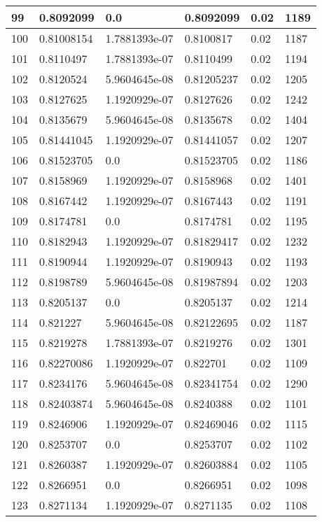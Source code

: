 \begin{longtable}{|l|l|l|l|l|l|}
99 & 0.8092099 & 0.0 & 0.8092099 & 0.02 & 1189 \\ \hline 
100 & 0.81008154 & 1.7881393e-07 & 0.8100817 & 0.02 & 1187 \\ \hline 
101 & 0.8110497 & 1.7881393e-07 & 0.8110499 & 0.02 & 1194 \\ \hline 
102 & 0.8120524 & 5.9604645e-08 & 0.81205237 & 0.02 & 1205 \\ \hline 
103 & 0.8127625 & 1.1920929e-07 & 0.8127626 & 0.02 & 1242 \\ \hline 
104 & 0.8135679 & 5.9604645e-08 & 0.8135678 & 0.02 & 1404 \\ \hline 
105 & 0.81441045 & 1.1920929e-07 & 0.81441057 & 0.02 & 1207 \\ \hline 
106 & 0.81523705 & 0.0 & 0.81523705 & 0.02 & 1186 \\ \hline 
107 & 0.8158969 & 1.1920929e-07 & 0.8158968 & 0.02 & 1401 \\ \hline 
108 & 0.8167442 & 1.1920929e-07 & 0.8167443 & 0.02 & 1191 \\ \hline 
109 & 0.8174781 & 0.0 & 0.8174781 & 0.02 & 1195 \\ \hline 
110 & 0.8182943 & 1.1920929e-07 & 0.81829417 & 0.02 & 1232 \\ \hline 
111 & 0.8190944 & 1.1920929e-07 & 0.8190943 & 0.02 & 1193 \\ \hline 
112 & 0.8198789 & 5.9604645e-08 & 0.81987894 & 0.02 & 1203 \\ \hline 
113 & 0.8205137 & 0.0 & 0.8205137 & 0.02 & 1214 \\ \hline 
114 & 0.821227 & 5.9604645e-08 & 0.82122695 & 0.02 & 1187 \\ \hline 
115 & 0.8219278 & 1.7881393e-07 & 0.8219276 & 0.02 & 1301 \\ \hline 
116 & 0.82270086 & 1.1920929e-07 & 0.822701 & 0.02 & 1109 \\ \hline 
117 & 0.8234176 & 5.9604645e-08 & 0.82341754 & 0.02 & 1290 \\ \hline 
118 & 0.82403874 & 5.9604645e-08 & 0.8240388 & 0.02 & 1101 \\ \hline 
119 & 0.8246906 & 1.1920929e-07 & 0.82469046 & 0.02 & 1115 \\ \hline 
120 & 0.8253707 & 0.0 & 0.8253707 & 0.02 & 1102 \\ \hline 
121 & 0.8260387 & 1.1920929e-07 & 0.82603884 & 0.02 & 1105 \\ \hline 
122 & 0.8266951 & 0.0 & 0.8266951 & 0.02 & 1098 \\ \hline 
123 & 0.8271134 & 1.1920929e-07 & 0.8271135 & 0.02 & 1108 \\ \hline 

\end{longtable}
